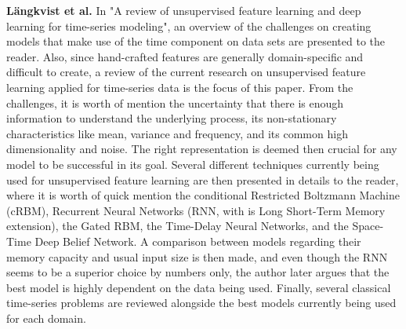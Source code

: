 \documentclass{kththesis}
\begin{document}
\textbf{Längkvist et al.} \citep{Langkvist2014} In "A review of unsupervised feature learning and deep learning for time-series modeling", an overview of the challenges on creating models that make use of the time component on data sets are presented to the reader. Also, since hand-crafted features are generally domain-specific and difficult to create, a review of the current research on unsupervised feature learning applied for time-series data is the focus of this paper. From the challenges, it is worth of mention the uncertainty that there is enough information to understand the underlying process, its non-stationary characteristics like mean, variance and frequency, and its common high dimensionality and noise. The right representation is deemed then crucial for any model to be successful in its goal. Several different techniques currently being used for unsupervised feature learning are then presented in details to the reader, where it is worth of quick mention the conditional Restricted Boltzmann Machine (cRBM), Recurrent Neural Networks (RNN, with is Long Short-Term Memory extension), the Gated RBM, the Time-Delay Neural Networks, and the Space-Time Deep Belief Network. A comparison between models regarding their memory capacity and usual input size is then made, and even though the RNN seems to be a superior choice by numbers only, the author later argues that the best model is highly dependent on the data being used. Finally, several classical time-series problems are reviewed alongside the best models currently being used for each domain.
\end{document}
